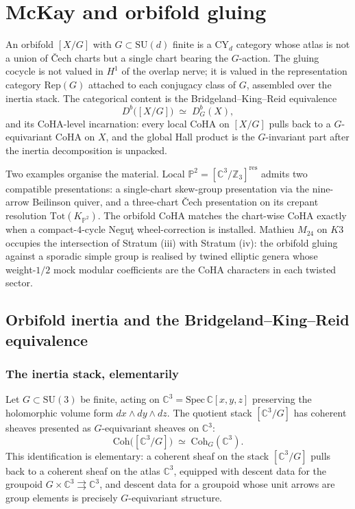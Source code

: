 \section{McKay and orbifold gluing}
\label{sec:gluing:mckay}
\label{part:gluing-mckay-orbifold}
An orbifold $[X/G]$ with $G \subset \mathrm{SU}(d)$ finite is a CY$_d$ category whose atlas is not a union of \v{C}ech charts but a single chart bearing the $G$-action. The gluing cocycle is not valued in $H^1$ of the overlap nerve; it is valued in the representation category $\mathrm{Rep}(G)$ attached to each conjugacy class of $G$, assembled over the inertia stack. The categorical content is the Bridgeland--King--Reid equivalence
\[
D^b\bigl([X/G]\bigr) \;\simeq\; D^b_G(X),
\]
and its CoHA-level incarnation: every local CoHA on $[X/G]$ pulls back to a $G$-equivariant CoHA on $X$, and the global Hall product is the $G$-invariant part after the inertia decomposition is unpacked.

Two examples organise the material. Local $\mathbb{P}^2 = [\mathbb{C}^3/\mathbb{Z}_3]^{\mathrm{res}}$ admits two compatible presentations: a single-chart skew-group presentation via the nine-arrow Beilinson quiver, and a three-chart \v{C}ech presentation on its crepant resolution $\mathrm{Tot}(K_{\mathbb{P}^2})$. The orbifold CoHA matches the chart-wise CoHA exactly when a compact-$4$-cycle Negu\c{t} wheel-correction is installed. Mathieu $M_{24}$ on $K3$ occupies the intersection of Stratum (iii) with Stratum (iv): the orbifold gluing against a sporadic simple group is realised by twined elliptic genera whose weight-$1/2$ mock modular coefficients are the CoHA characters in each twisted sector.

\subsection{Orbifold inertia and the Bridgeland--King--Reid equivalence}
\label{sec:orbifold-inertia-bkr}

\subsubsection{The inertia stack, elementarily}
\label{subsec:inertia-stack}

Let $G \subset \mathrm{SU}(3)$ be finite, acting on $\mathbb{C}^3 = \mathrm{Spec}\,\mathbb{C}[x,y,z]$ preserving the holomorphic volume form $dx \wedge dy \wedge dz$. The quotient stack $[\mathbb{C}^3/G]$ has coherent sheaves presented as $G$-equivariant sheaves on $\mathbb{C}^3$:
\[
\mathrm{Coh}\bigl([\mathbb{C}^3/G]\bigr) \;\simeq\; \mathrm{Coh}_G(\mathbb{C}^3).
\]
This identification is elementary: a coherent sheaf on the stack $[\mathbb{C}^3/G]$ pulls back to a coherent sheaf on the atlas $\mathbb{C}^3$, equipped with descent data for the groupoid $G \times \mathbb{C}^3 \rightrightarrows \mathbb{C}^3$, and descent data for a groupoid whose unit arrows are group elements is precisely $G$-equivariant structure.

